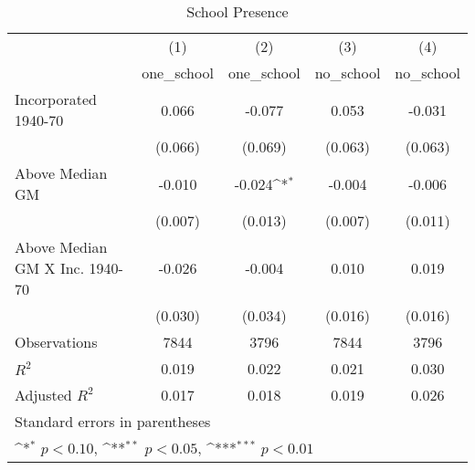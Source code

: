 \begin{table}[htbp]\centering
\def\sym#1{\ifmmode^{#1}\else\(^{#1}\)\fi}
\caption{School Presence}
\begin{tabular}{l*{4}{c}}
\hline\hline
                    &\multicolumn{1}{c}{(1)}&\multicolumn{1}{c}{(2)}&\multicolumn{1}{c}{(3)}&\multicolumn{1}{c}{(4)}\\
                    &\multicolumn{1}{c}{one\_school}&\multicolumn{1}{c}{one\_school}&\multicolumn{1}{c}{no\_school}&\multicolumn{1}{c}{no\_school}\\
\hline
Incorporated 1940-70&       0.066         &      -0.077         &       0.053         &      -0.031         \\
                    &     (0.066)         &     (0.069)         &     (0.063)         &     (0.063)         \\
[1em]
Above Median GM     &      -0.010         &      -0.024\sym{*}  &      -0.004         &      -0.006         \\
                    &     (0.007)         &     (0.013)         &     (0.007)         &     (0.011)         \\
[1em]
Above Median GM X Inc. 1940-70&      -0.026         &      -0.004         &       0.010         &       0.019         \\
                    &     (0.030)         &     (0.034)         &     (0.016)         &     (0.016)         \\
\hline
Observations        &        7844         &        3796         &        7844         &        3796         \\
\(R^{2}\)           &       0.019         &       0.022         &       0.021         &       0.030         \\
Adjusted \(R^{2}\)  &       0.017         &       0.018         &       0.019         &       0.026         \\
\hline\hline
\multicolumn{5}{l}{\footnotesize Standard errors in parentheses}\\
\multicolumn{5}{l}{\footnotesize \sym{*} \(p<0.10\), \sym{**} \(p<0.05\), \sym{***} \(p<0.01\)}\\
\end{tabular}
\end{table}
